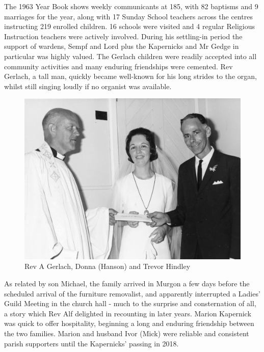The 1963 Year Book shows weekly communicants at 185, with 82 baptisms and 9 marriages for the year, along with 17 Sunday School teachers across the centres instructing 219 enrolled children. 16 schools were visited and 4 regular Religious Instruction teachers were actively involved. During his settling-in period the support of wardens, Sempf and Lord plus the Kapernicks and Mr Gedge in particular was highly valued. The Gerlach children were readily accepted into all community activities and many enduring friendships were cemented. Rev Gerlach, a tall man, quickly became well-known for his long strides to the organ, whilst still singing loudly if no organist was available.









\begin{figure}
\begin{center}
\includegraphics[width=1.\linewidth,center]{../images/donnaVestry.jpg}
\caption{Rev A Gerlach, Donna (Hanson) and Trevor Hindley}
\end{center}
\end{figure}




As related by son Michael, the family arrived in Murgon a few days before the scheduled arrival of the furniture removalist, and apparently interrupted a Ladies' Guild Meeting in the church hall - much to the surprise and consternation of all, a story which Rev Alf delighted in recounting in later years. Marion Kapernick was quick to offer hospitality, beginning a long and enduring friendship between the two families. Marion and husband Ivor (Mick) were reliable and consistent parish supporters until the Kapernicks' passing in 2018.



